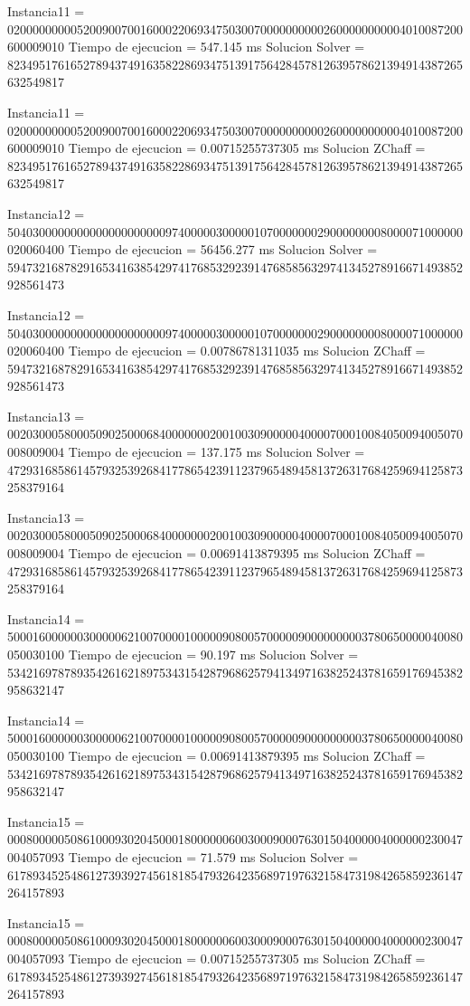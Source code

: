 Instancia11 = 020000000005200900700160002206934750300700000000002600000000004010087200600009010
Tiempo de ejecucion = 547.145 ms
Solucion Solver = 823495176165278943749163582286934751391756428457812639578621394914387265632549817

Instancia11 = 020000000005200900700160002206934750300700000000002600000000004010087200600009010
Tiempo de ejecucion = 0.00715255737305 ms
Solucion ZChaff = 823495176165278943749163582286934751391756428457812639578621394914387265632549817

Instancia12 = 504030000000000000000000097400000300000107000000029000000008000071000000020060400
Tiempo de ejecucion = 56456.277 ms
Solucion Solver = 594732168782916534163854297417685329239147685856329741345278916671493852928561473

Instancia12 = 504030000000000000000000097400000300000107000000029000000008000071000000020060400
Tiempo de ejecucion = 0.00786781311035 ms
Solucion ZChaff = 594732168782916534163854297417685329239147685856329741345278916671493852928561473

Instancia13 = 002030005800050902500068400000002001003090000040000700010084050094005070008009004
Tiempo de ejecucion = 137.175 ms
Solucion Solver = 472931685861457932539268417786542391123796548945813726317684259694125873258379164

Instancia13 = 002030005800050902500068400000002001003090000040000700010084050094005070008009004
Tiempo de ejecucion = 0.00691413879395 ms
Solucion ZChaff = 472931685861457932539268417786542391123796548945813726317684259694125873258379164

Instancia14 = 500016000000300000621007000010000090800570000090000000003780650000040080050030100
Tiempo de ejecucion = 90.197 ms
Solucion Solver = 534216978789354261621897534315428796862579413497163825243781659176945382958632147

Instancia14 = 500016000000300000621007000010000090800570000090000000003780650000040080050030100
Tiempo de ejecucion = 0.00691413879395 ms
Solucion ZChaff = 534216978789354261621897534315428796862579413497163825243781659176945382958632147

Instancia15 = 000800000508610009302045000180000006003000900076301504000004000000230047004057093
Tiempo de ejecucion = 71.579 ms
Solucion Solver = 617893452548612739392745618185479326423568971976321584731984265859236147264157893

Instancia15 = 000800000508610009302045000180000006003000900076301504000004000000230047004057093
Tiempo de ejecucion = 0.00715255737305 ms
Solucion ZChaff = 617893452548612739392745618185479326423568971976321584731984265859236147264157893

